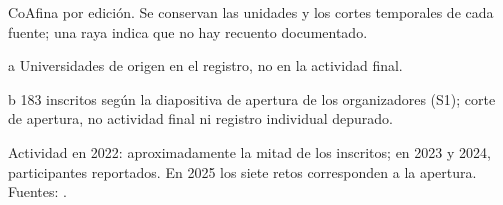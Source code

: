 \begin{table}[tbp]
\begin{threeparttable}
\caption{CoAfina por edición. Se conservan las unidades y los cortes temporales de cada fuente; una raya indica que no hay recuento documentado.}\label{tab:ediciones}

\begin{tablenotes}[flushleft]
\item[a] Universidades de origen en el registro, no en la actividad final.
\item[b] 183 inscritos según la diapositiva de apertura de los organizadores (S1); corte de apertura, no actividad final ni registro individual depurado.
\item Actividad en 2022: aproximadamente la mitad de los inscritos; en 2023 y 2024, participantes reportados. En 2025 los siete retos corresponden a la apertura. Fuentes: \cite{coafina2022,coafina2023pre,coafina,uis2023,coafina2024,coafina2025,coafina2025apertura}.
\end{tablenotes}
\end{threeparttable}
\end{table}
